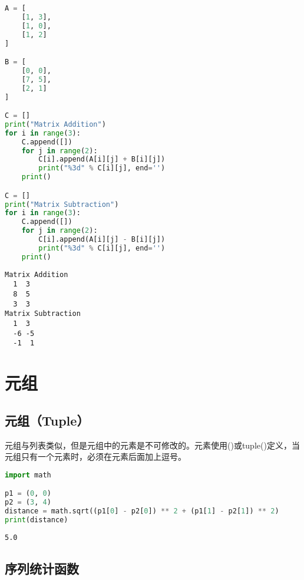 \begin{lstlisting}[language=Python]
A = [
	[1, 3],
	[1, 0],
	[1, 2]
]

B = [
	[0, 0],
	[7, 5],
	[2, 1]
]

C = []
print("Matrix Addition")
for i in range(3):
	C.append([])
	for j in range(2):
		C[i].append(A[i][j] + B[i][j])
		print("%3d" % C[i][j], end='')
	print()

C = []
print("Matrix Subtraction")
for i in range(3):
	C.append([])
	for j in range(2):
		C[i].append(A[i][j] - B[i][j])
		print("%3d" % C[i][j], end='')
	print()
\end{lstlisting}

\begin{tcolorbox}
	\begin{verbatim}
Matrix Addition
  1  3
  8  5
  3  3
Matrix Subtraction
  1  3
  -6 -5
  -1  1
	\end{verbatim}
\end{tcolorbox}

\newpage

\section{元组}

\subsection{元组（Tuple）}

元组与列表类似，但是元组中的元素是不可修改的。元素使用()或tuple()定义，当元组只有一个元素时，必须在元素后面加上逗号。\\


\begin{lstlisting}[language=Python]
import math

p1 = (0, 0)
p2 = (3, 4)
distance = math.sqrt((p1[0] - p2[0]) ** 2 + (p1[1] - p2[1]) ** 2)
print(distance)
\end{lstlisting}

\begin{tcolorbox}
	\begin{verbatim}
5.0
\end{verbatim}
\end{tcolorbox}

\vspace{0.5cm}

\subsection{序列统计函数}


